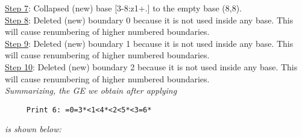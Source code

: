 \documentclass[final]{article}
\begin{document}
{\underline{Step 7}:} Collapsed (new) base [3-8:z1+.]  to the empty base (8,8).
\\
{\underline{Step 8}:} Deleted (new) boundary 0 because it is not used inside any base.  This will cause renumbering of higher numbered boundaries.
\\
{\underline{Step 9}:} Deleted (new) boundary 1 because it is not used inside any base.  This will cause renumbering of higher numbered boundaries.
\\
{\underline{Step 10}:} Deleted (new) boundary 2 because it is not used inside any base.  This will cause renumbering of higher numbered boundaries.
\\[0.1in]
{\em Summarizing, the GE we obtain after applying}
\begin{verbatim}
     Print 6: =0=3*<1<4*<2<5*<3=6*
\end{verbatim}
{\em is shown below:}
\end{document}
